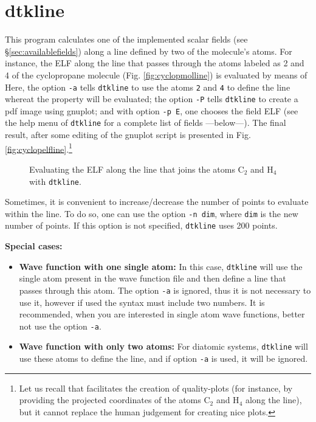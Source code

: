 \section{dtkline}
This program calculates one of the implemented scalar fields (see \S\ref{sec:availablefields}) along a line defined by two of the molecule's atoms. For instance, the ELF along the line that passes through the atoms labeled as 2 and 4 of the cyclopropane molecule (Fig. \ref{fig:cyclopmolline}) is evaluated by means of\\
Here, the option \texttt{-a} tells \texttt{dtkline} to use the atoms \texttt{2} and \texttt{4} to define the line whereat the property will be evaluated; the option \texttt{-P} tells \texttt{dtkline} to create a pdf image using gnuplot; and with option \texttt{-p E}, one chooses the field ELF (see the help menu of \texttt{dtkline} for a complete list of fields ---below---). The final result, after some editing of the gnuplot script is presented in Fig. \ref{fig:cyclopelfline}.\footnote{Let us recall that \DTK{} facilitates the creation of quality-plots (for instance, by providing the projected coordinates of the atoms C$_2$ and H$_4$ along the line), but it cannot replace the human judgement for creating nice plots.}
\begin{figure}[hb!]
\centering
{}\quad%
\caption{Evaluating the ELF along the line that joins the atoms C$_2$ and H$_4$ with \texttt{dtkline}.}\label{fig:dtklineuseex}
\end{figure}

Sometimes, it is convenient to increase/decrease the number of points to evaluate within the line. To do so, one can use the option \texttt{-n dim}, where \texttt{dim} is the new number of points. If this option is not specified, \texttt{dtkline} uses 200 points.

\textbf{Special cases:}
\begin{itemize}
   \item \textbf{Wave function with one single atom:} In this case, \texttt{dtkline} will use the single atom present in the wave function file and then define a line that passes through this atom. The option \texttt{-a} is ignored, thus it is not necessary to use it, however if used the syntax must include two numbers. It is recommended, when you are interested in single atom wave functions, better not use the option \texttt{-a}.
   \item \textbf{Wave function with only two atoms:} For diatomic systems, \texttt{dtkline} will use these atoms to define the line, and if option \texttt{-a} is used, it will be ignored. 
\end{itemize}

